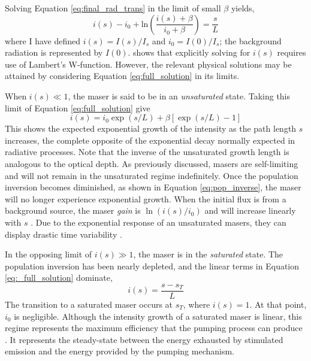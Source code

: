 Solving Equation \ref{eq:final_rad_trans} in the limit of small $\beta$ yields,
\begin{equation}
\label{eq:full_solution}
i(s) - i_0 + \mathrm{ln}\left( \frac{i(s) + \beta}{i_0 + \beta} \right) = \frac{s}{L}
\end{equation}
where I have defined $i(s) = I(s)/I_s$ and $i_0 = I(0)/I_s$; the background radiation is represented by $I(0)$. \citet{Gray_2009} shows that explicitly solving for $i(s)$ requires use of Lambert's W-function. However, the relevant physical solutions may be attained by considering Equation \ref{eq:full_solution} in its limits.

When $i(s)\ll 1$, the maser is said to be in an {\it unsaturated} state. Taking this limit of Equation \ref{eq:full_solution} give
\begin{equation}
\label{eq:unsat_solution}
i(s) = i_0 \exp\left(s/L\right) + \beta\left[ \exp\left(s/L\right) - 1 \right]
\end{equation}
This shows the expected exponential growth of the intensity as the path length $s$ increases, the complete opposite of the exponential decay normally expected in radiative processes. Note that the inverse of the unsaturated growth length is analogous to the optical depth. As previously discussed, masers are self-limiting and will not remain in the unsaturated regime indefinitely. Once the population inversion becomes diminished, as shown in Equation \ref{eq:pop_inverse}, the maser will no longer experience exponential growth. When the initial flux is from a background source, the maser {\it gain} is $\ln \left( i(s)/i_0 \right)$ and will increase linearly with $s$ \citet{stahler_palla_2004}. Due to the exponential response of an unsaturated masers, they can display drastic time variability \citep{Elitzur_1992}. 

In the opposing limit of $i(s) \gg 1$, the maser is in the {\it saturated} state. The population inversion has been nearly depleted, and the linear terms in Equation \ref{eq:_full_solution} dominate,
\begin{equation}
\label{eq:sat_solution}
i(s) = \frac{s-s_{T}}{L}
\end{equation}
The transition to a saturated maser occurs at $s_T$, where $i(s)=1$. At that point, $i_0$ is negligible. Although the intensity growth of a saturated maser is linear, this regime represents the maximum efficiency that the pumping process can produce \citep{Elitzur_1992}. It represents the steady-state between the energy exhausted by stimulated emission and the energy provided by the pumping mechanism.

